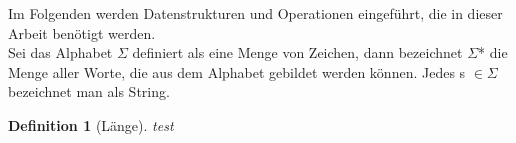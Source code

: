 \documentclass[a4paper,11pt]{scrartcl}%
\theoremstyle{change}
\theoremstyle{nonumberplain}
\theoremstyle{change}
\newtheorem{definition}[theorem]{Definition}
\theoremstyle{nonumberplain}
\theoremstyle{change}
\theoremstyle{nonumberplain}
\begin{document}
	Im Folgenden werden Datenstrukturen und Operationen eingeführt, die in dieser Arbeit benötigt werden.\\
	Sei das Alphabet $\Sigma$ definiert als eine Menge von Zeichen, dann bezeichnet $\Sigma$* die Menge aller Worte, die aus dem Alphabet gebildet werden können. Jedes s $\in \Sigma$ bezeichnet man als String. 
	
	\begin{definition}[Länge]
		test
	\end{definition}
	
	












%
%
\end{document}

